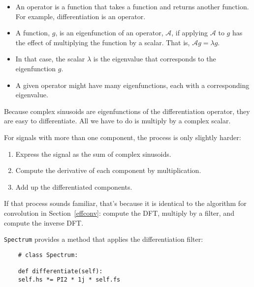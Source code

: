 \newcommand{\op}{\mathcal{A}}

\begin{itemize}
	
	\item An operator is a function that takes a function and returns
	another function.  For example, differentiation is an operator.
	
	\item A function, $g$, is an eigenfunction of an operator, $\op$, if
	applying $\op$ to $g$ has the effect of multiplying the function by
	a scalar.  That is, $\op g = \lambda g$.
	
	\item In that case, the scalar $\lambda$ is the eigenvalue that
	corresponds to the eigenfunction $g$.
	
	\item A given operator might have many eigenfunctions, each with
	a corresponding eigenvalue.
	
\end{itemize}

Because complex sinusoids are eigenfunctions of the differentiation
operator, they are easy to differentiate.  All we have to do is
multiply by a complex scalar.

For signals with more than one
component, the process is only slightly harder:

\begin{enumerate}
	
	\item Express the signal as the sum of complex sinusoids.
	
	\item Compute the derivative of each component by multiplication.
	
	\item Add up the differentiated components.
	
\end{enumerate}

If that process sounds familiar, that's because it is identical
to the algorithm for convolution in Section~\ref{effconv}: compute
the DFT, multiply by a filter, and compute the inverse DFT.

{\tt Spectrum} provides a method that applies the differentiation
filter:

\begin{verbatim}
	# class Spectrum:
	
	def differentiate(self):
	self.hs *= PI2 * 1j * self.fs
\end{verbatim}

